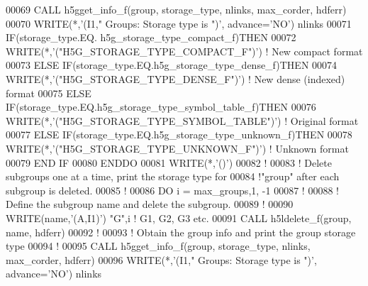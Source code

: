 \begin{DoxyCode}
00069      \textcolor{keyword}{CALL }h5gget\_info\_f(group, storage\_type, nlinks, max\_corder, hdferr)
00070      \textcolor{keyword}{WRITE}(*,\textcolor{stringliteral}{'(I1," Groups: Storage type is ")'}, advance=\textcolor{stringliteral}{'NO'}) nlinks
00071      \textcolor{keywordflow}{IF}(storage\_type.EQ. h5g\_storage\_type\_compact\_f)\textcolor{keywordflow}{THEN}
00072         \textcolor{keyword}{WRITE}(*,\textcolor{stringliteral}{'("H5G\_STORAGE\_TYPE\_COMPACT\_F")'})  \textcolor{comment}{! New compact format}
00073      \textcolor{keywordflow}{ELSE} \textcolor{keywordflow}{IF}(storage\_type.EQ.h5g\_storage\_type\_dense\_f)\textcolor{keywordflow}{THEN}
00074         \textcolor{keyword}{WRITE}(*,\textcolor{stringliteral}{'("H5G\_STORAGE\_TYPE\_DENSE\_F")'}) \textcolor{comment}{! New dense (indexed) format}
00075      \textcolor{keywordflow}{ELSE} \textcolor{keywordflow}{IF}(storage\_type.EQ.h5g\_storage\_type\_symbol\_table\_f)\textcolor{keywordflow}{THEN}
00076         \textcolor{keyword}{WRITE}(*,\textcolor{stringliteral}{'("H5G\_STORAGE\_TYPE\_SYMBOL\_TABLE")'}) \textcolor{comment}{! Original format}
00077      \textcolor{keywordflow}{ELSE} \textcolor{keywordflow}{IF}(storage\_type.EQ.h5g\_storage\_type\_unknown\_f)\textcolor{keywordflow}{THEN}
00078         \textcolor{keyword}{WRITE}(*,\textcolor{stringliteral}{'("H5G\_STORAGE\_TYPE\_UNKNOWN\_F")'}) \textcolor{comment}{! Unknown format}
00079 \textcolor{keywordflow}{     END IF}
00080 \textcolor{keywordflow}{  ENDDO}
00081   \textcolor{keyword}{WRITE}(*,\textcolor{stringliteral}{'()'})
00082   \textcolor{comment}{!}
00083   \textcolor{comment}{! Delete subgroups one at a time, print the storage type for}
00084   \textcolor{comment}{!"group" after each subgroup is deleted.}
00085   \textcolor{comment}{!}
00086   \textcolor{keywordflow}{DO} i = max\_groups,1, -1
00087      \textcolor{comment}{!}
00088      \textcolor{comment}{! Define the subgroup name and delete the subgroup.}
00089      \textcolor{comment}{!}
00090      \textcolor{keyword}{WRITE}(name,\textcolor{stringliteral}{'(A,I1)'}) \textcolor{stringliteral}{"G"},i \textcolor{comment}{! G1, G2, G3 etc.}
00091      \textcolor{keyword}{CALL }h5ldelete\_f(group, name, hdferr)
00092      \textcolor{comment}{!}
00093      \textcolor{comment}{! Obtain the group info and print the group storage type}
00094      \textcolor{comment}{!}
00095      \textcolor{keyword}{CALL }h5gget\_info\_f(group, storage\_type, nlinks, max\_corder, hdferr)
00096      \textcolor{keyword}{WRITE}(*,\textcolor{stringliteral}{'(I1," Groups: Storage type is ")'}, advance=\textcolor{stringliteral}{'NO'}) nlinks

\end{DoxyCode}
